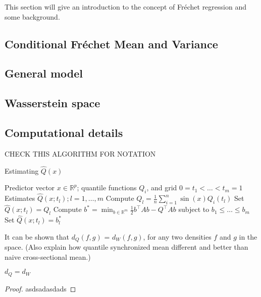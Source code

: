 This section will give an introduction to the concept of Fréchet regression
and some background.

\subsection{Conditional Fréchet Mean and Variance}
\label{sec:condmean}

\subsection{General model}
\label{sec:general}

\subsection{Wasserstein space}
\label{sec:wasserstein_space}

\subsection{Computational details}
\label{sec:computation}

CHECK THIS ALGORITHM FOR NOTATION
\begin{algorithm}
    \caption{Estimating \(\hat{Q}(x)\)}
    \label{alg:quadprog}
    \begin{algorithmic}[1]
    \Require Predictor vector \( x \in \mathbb{R}^p \); quantile functions \( Q_i \), and grid \( 0 = t_1 < \ldots < t_m = 1 \)
    \Ensure Estimates \( \hat{Q}(x; t_l); l = 1, \ldots, m \)
        \State Compute \( Q_l = \frac{1}{n} \sum_{i=1}^{n} \sin(x) Q_i(t_l) \)
    \EndFor
        \State Set \( \hat{Q}(x; t_l) = Q_l \)
    \Else
        \State Compute \( b^* = \min_{b \in \mathbb{R}^m} \frac{1}{2} b^\top A b - Q^\top A b \) subject to \( b_1 \leq \ldots \leq b_m \)
        \State Set \( \hat{Q}(x; t_l) = b^*_l \)
    \EndIf
    \end{algorithmic}
\end{algorithm}

It can be shown that $d_Q(f,g)$ = $d_W(f,g)$, for any two densities $f$ and $g$ in the
space. (Also explain how quantile synchronized mean different and better than naive
cross-sectional mean.)
\begin{lemma}
    \label{lemma:dqeqdw}
    $d_Q = d_W$
\end{lemma}
\begin{proof}
    asdsadasdads
\end{proof}

